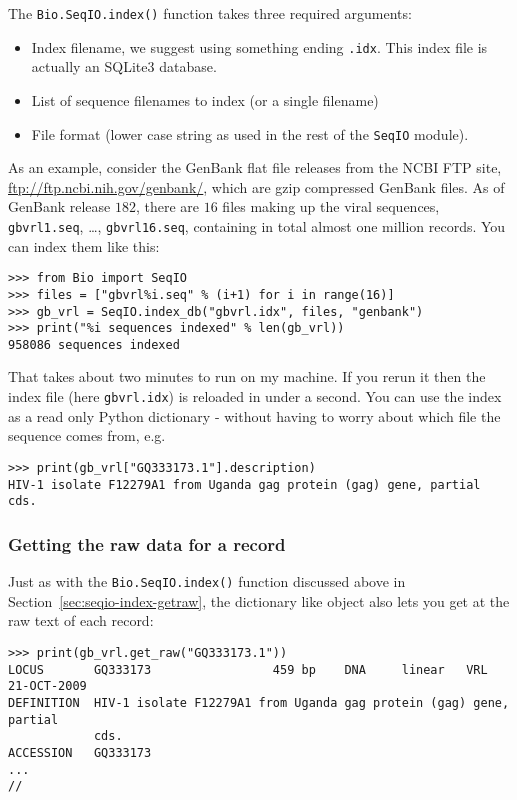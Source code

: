 \documentclass{report}
\begin{document}
The \verb|Bio.SeqIO.index()| function takes three required arguments:
\begin{itemize}
\item Index filename, we suggest using something ending \texttt{.idx}.
This index file is actually an SQLite3 database.
\item List of sequence filenames to index (or a single filename)
\item File format (lower case string as used in the rest of the
\verb|SeqIO| module).
\end{itemize}

As an example, consider the GenBank flat file releases from the NCBI FTP site,
\url{ftp://ftp.ncbi.nih.gov/genbank/}, which are gzip compressed GenBank files.
As of GenBank release $182$, there are $16$ files making up the viral sequences,
\texttt{gbvrl1.seq}, \ldots, \texttt{gbvrl16.seq}, containing in total almost
one million records. You can index them like this:

\begin{verbatim}
>>> from Bio import SeqIO
>>> files = ["gbvrl%i.seq" % (i+1) for i in range(16)]
>>> gb_vrl = SeqIO.index_db("gbvrl.idx", files, "genbank")
>>> print("%i sequences indexed" % len(gb_vrl))
958086 sequences indexed
\end{verbatim}

That takes about two minutes to run on my machine. If you rerun it then the
index file (here \texttt{gbvrl.idx}) is reloaded in under a second. You can
use the index as a read only Python dictionary - without having to worry
about which file the sequence comes from, e.g.

\begin{verbatim}
>>> print(gb_vrl["GQ333173.1"].description)
HIV-1 isolate F12279A1 from Uganda gag protein (gag) gene, partial cds.
\end{verbatim}

\subsubsection{Getting the raw data for a record}

Just as with the \verb|Bio.SeqIO.index()| function discussed above in
Section~\ref{sec:seqio-index-getraw}, the dictionary like object also lets you
get at the raw text of each record:

\begin{verbatim}
>>> print(gb_vrl.get_raw("GQ333173.1"))
LOCUS       GQ333173                 459 bp    DNA     linear   VRL 21-OCT-2009
DEFINITION  HIV-1 isolate F12279A1 from Uganda gag protein (gag) gene, partial
            cds.
ACCESSION   GQ333173
...
//
\end{verbatim}
\end{document}
